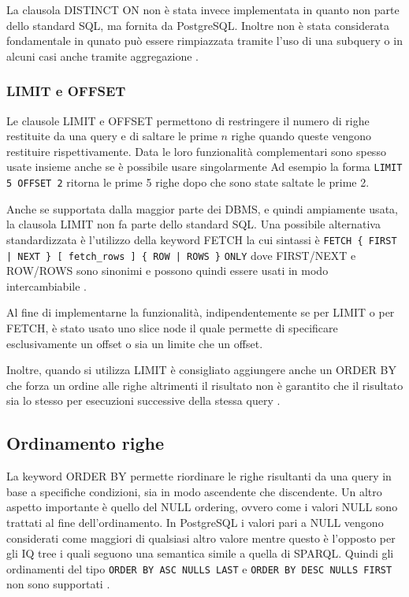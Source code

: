 La clausola DISTINCT ON non è stata invece implementata in quanto non parte dello standard SQL, ma fornita da PostgreSQL. Inoltre non è stata considerata fondamentale in qunato
può essere rimpiazzata tramite l'uso di una subquery o in alcuni casi anche tramite aggregazione \cite{PGDistinct}.
\subsubsection*{LIMIT e OFFSET}
Le clausole LIMIT e OFFSET permettono di restringere il numero di righe restituite da una query e di saltare le prime $n$ righe quando queste vengono restituire rispettivamente.
Data le loro funzionalità complementari sono spesso usate insieme anche se è possibile usare singolarmente
Ad esempio la forma \verb+LIMIT 5 OFFSET 2+ ritorna le prime 5 righe dopo che sono state saltate le prime 2.

Anche se supportata dalla maggior parte dei DBMS, e quindi ampiamente usata, la clausola LIMIT non fa parte dello standard SQL. Una possibile alternativa standardizzata è l'utilizzo
della keyword FETCH la cui sintassi è \verb+FETCH { FIRST | NEXT } [ fetch_rows ] { ROW | ROWS }+ \verb+ONLY+ dove FIRST/NEXT e ROW/ROWS sono sinonimi e possono quindi essere usati
in modo intercambiabile \cite{Fetch}.

Al fine di implementarne la funzionalità, indipendentemente se per LIMIT o per FETCH, è stato usato uno slice node il quale permette di specificare esclusivamente un offset o sia
un limite che un offset.

Inoltre, quando si utilizza LIMIT è consigliato aggiungere anche un ORDER BY che forza un ordine alle righe altrimenti il risultato non è garantito che il risultato sia lo stesso per
esecuzioni successive della stessa query \cite{PGLimit}.

\subsection{Ordinamento righe}
La keyword ORDER BY permette riordinare le righe risultanti da una query in base a specifiche condizioni, sia in modo ascendente che discendente. Un altro aspetto importante è quello del 
NULL ordering, ovvero come i valori NULL sono trattati al fine dell'ordinamento. In PostgreSQL i valori pari a NULL vengono considerati come maggiori di qualsiasi altro valore mentre questo 
è l'opposto per gli IQ tree i quali seguono una semantica simile a quella di SPARQL. Quindi gli ordinamenti del tipo \verb+ORDER BY ASC NULLS LAST+ e \verb+ORDER BY DESC NULLS FIRST+ 
non sono supportati \cite{PGOrderBY}. 

